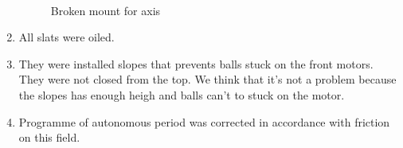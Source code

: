 \begin{enumerate}
		\begin{figure}[H]
			\begin{minipage}[h]{0.2\linewidth}
				\center  
			\end{minipage}
			\begin{minipage}[h]{0.6\linewidth}
				\caption{Broken mount for axis}
			\end{minipage}
		\end{figure}
		
	\item All slats were oiled.	
	
	\item They were installed slopes that prevents balls stuck on the front motors. They were not closed from the top. We think that it's not a problem because the slopes has enough heigh and balls can't to stuck on the motor. 
	
    \item Programme of autonomous period was corrected in accordance with friction on this field.
	
\end{enumerate}
\fillpage